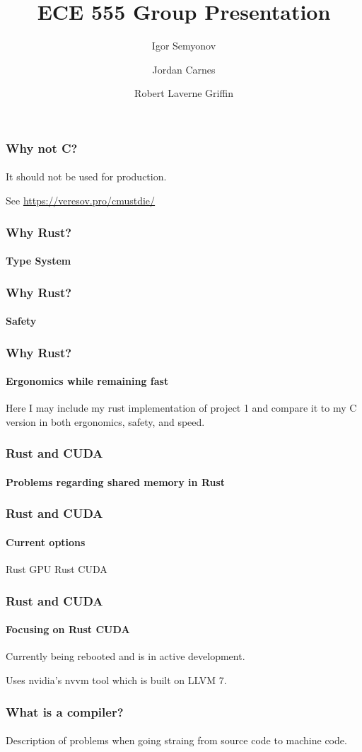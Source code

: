 \documentclass[aspectratio=169]{beamer}
\title[Short Title]{
    ECE 555 Group Presentation
}
\author{
	Igor Semyonov
	\and Jordan Carnes
	\and Robert Laverne Griffin
}
\institute{
    George Macon University, Department of Electrical and Computer Engineering
}
\begin{document}
\begin{frame}
    \vspace{-1.8cm}
	\titlepage
\end{frame}

\begin{frame}
	\frametitle{Why not C?}
    \framesubtitle{}

    It should not be used for production.

    See \url{https://veresov.pro/cmustdie/}
\end{frame}

\begin{frame}
	\frametitle{Why Rust?}
    \framesubtitle{Type System}
\end{frame}

\begin{frame}
	\frametitle{Why Rust?}
    \framesubtitle{Safety}
\end{frame}

\begin{frame}
	\frametitle{Why Rust?}
    \framesubtitle{Ergonomics while remaining fast}

    Here I may include my rust implementation of project 1 and compare it to my C version in both ergonomics, safety, and speed.
\end{frame}

\begin{frame}
	\frametitle{Rust and CUDA}
    \framesubtitle{Problems regarding shared memory in Rust}
\end{frame}

\begin{frame}
	\frametitle{Rust and CUDA}
    \framesubtitle{Current options}

    \begin{outline}[itemize]
        \1 Rust GPU
        \1 Rust CUDA
    \end{outline}
\end{frame}

\begin{frame}
	\frametitle{Rust and CUDA}
    \framesubtitle{Focusing on Rust CUDA}

    Currently being rebooted and is in active development.

    Uses nvidia's nvvm tool which is built on LLVM 7.
\end{frame}

\begin{frame}
	\frametitle{What is a compiler?}
    \framesubtitle{}

    Description of problems when going straing from source code to machine code.
\end{frame}
\end{document}

